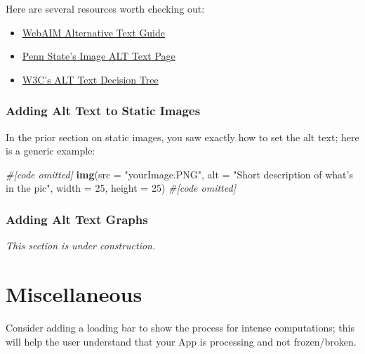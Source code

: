 \documentclass[
]{book}
\newenvironment{Shaded}{\begin{snugshade}}{\end{snugshade}}
\newcommand{\CommentTok}[1]{\textcolor[rgb]{0.56,0.35,0.01}{\textit{#1}}}
\newcommand{\DataTypeTok}[1]{\textcolor[rgb]{0.13,0.29,0.53}{#1}}
\newcommand{\DecValTok}[1]{\textcolor[rgb]{0.00,0.00,0.81}{#1}}
\newcommand{\KeywordTok}[1]{\textcolor[rgb]{0.13,0.29,0.53}{\textbf{#1}}}
\newcommand{\NormalTok}[1]{#1}
\newcommand{\StringTok}[1]{\textcolor[rgb]{0.31,0.60,0.02}{#1}}
\providecommand{\tightlist}{%
  \setlength{\itemsep}{0pt}\setlength{\parskip}{0pt}}
\begin{document}
Here are several resources worth checking out:

\begin{itemize}
\tightlist
\item
  \href{https://webaim.org/techniques/alttext/\#basics}{WebAIM Alternative Text Guide}
\item
  \href{https://accessibility.psu.edu/images/alttext/}{Penn State's Image ALT Text Page}
\item
  \href{https://www.w3.org/WAI/tutorials/images/decision-tree/}{W3C's ALT Text Decision Tree}
\end{itemize}

\hypertarget{adding-alt-text-to-static-images}{%
\subsubsection{Adding Alt Text to Static Images}\label{adding-alt-text-to-static-images}}

In the prior section on static images, you saw exactly how to set the alt text; here is a generic example:

\begin{Shaded}
\begin{Highlighting}[]
\CommentTok{#[code omitted]}
\KeywordTok{img}\NormalTok{(}\DataTypeTok{src =} \StringTok{"yourImage.PNG"}\NormalTok{,}
    \DataTypeTok{alt =} \StringTok{"Short description of what's in the pic"}\NormalTok{,}
    \DataTypeTok{width =} \DecValTok{25}\NormalTok{, }\DataTypeTok{height =} \DecValTok{25}\NormalTok{)}
\CommentTok{#[code omitted]}
\end{Highlighting}
\end{Shaded}

\hypertarget{adding-alt-text-graphs}{%
\subsubsection{Adding Alt Text Graphs}\label{adding-alt-text-graphs}}

\emph{This section is under construction.}

\hypertarget{miscellaneous}{%
\section{Miscellaneous}\label{miscellaneous}}

Consider adding a loading bar to show the process for intense computations; this will help the user understand that your App is processing and not frozen/broken.
\end{document}
